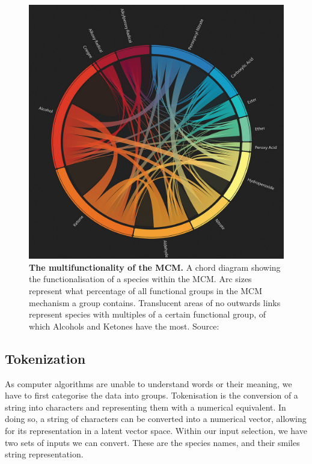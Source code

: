 \begin{figure}[H]
    \centering
    \includegraphics[width=\textwidth]{4fig/coverfig.jpg}
    \caption{\textbf{The multifunctionality of the MCM.} A chord diagram showing the functionalisation of a species within the MCM. Arc sizes represent what percentage of all functional groups in the MCM mechanism a group contains. Translucent areas of no outwards links represent species with multiples of a certain functional group, of which Alcohols and Ketones have the most.
    Source: \citep{cover} }
    \label{fig:covermcm}
\end{figure}



\subsection{Tokenization}
As computer algorithms are unable to understand words or their meaning, we have to first categorise the data into groups. Tokenisation is the conversion of a string into characters and representing them with a numerical equivalent. In doing so, a string of characters can be converted into a numerical vector, allowing for its representation in a latent vector space.
Within our input selection, we have two sets of inputs we can convert. These are the species names, and their smiles string representation.



